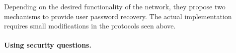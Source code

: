 
Depending on the desired functionality of the network, they propose two
mechanisms to provide user password recovery. The actual implementation
requires small modifications in the protocols seen above.

\paragraph{Using security questions.}


